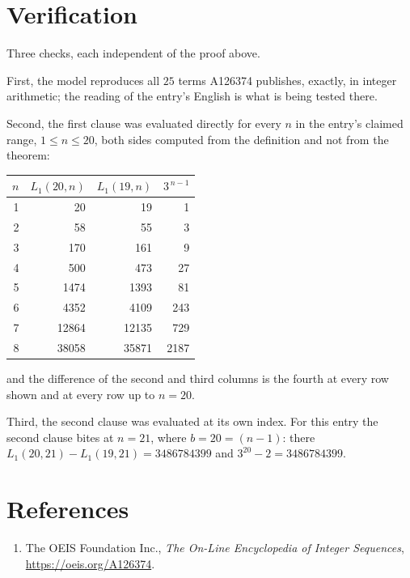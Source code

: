 \documentclass[11pt,a4paper]{article}
\theoremstyle{plain}
\theoremstyle{definition}
\begin{document}
\section{Verification}

Three checks, each independent of the proof above.

First, the model reproduces all $25$ terms A126374 publishes, exactly, in integer
arithmetic; the reading of the entry's English is what is being tested there.

Second, the first clause was evaluated directly for every $n$ in the entry's claimed range,
$1\le n\le20$, both sides computed from the definition and not from the theorem:

\begin{center}
\begin{tabular}{rrrr}
$n$ & $L_{1}(20,n)$ & $L_{1}(19,n)$ & $3^{\,n-1}$ \\ \hline
1 & 20 & 19 & 1 \\
2 & 58 & 55 & 3 \\
3 & 170 & 161 & 9 \\
4 & 500 & 473 & 27 \\
5 & 1474 & 1393 & 81 \\
6 & 4352 & 4109 & 243 \\
7 & 12864 & 12135 & 729 \\
8 & 38058 & 35871 & 2187 \\
\end{tabular}
\end{center}

\noindent and the difference of the second and third columns is the fourth at every row shown
and at every row up to $n=20$.

Third, the second clause was evaluated at its own index. For this entry the second clause bites at $n=21$, where $b=20=(n-1)$: there $L_{1}(20,21)-L_{1}(19,21)=3486784399$ and $3^{20}-2=3486784399$.

\section*{References}
\begin{enumerate}
\item The OEIS Foundation Inc., \emph{The On-Line Encyclopedia of Integer Sequences},
\url{https://oeis.org/A126374}.
\end{enumerate}
\end{document}
